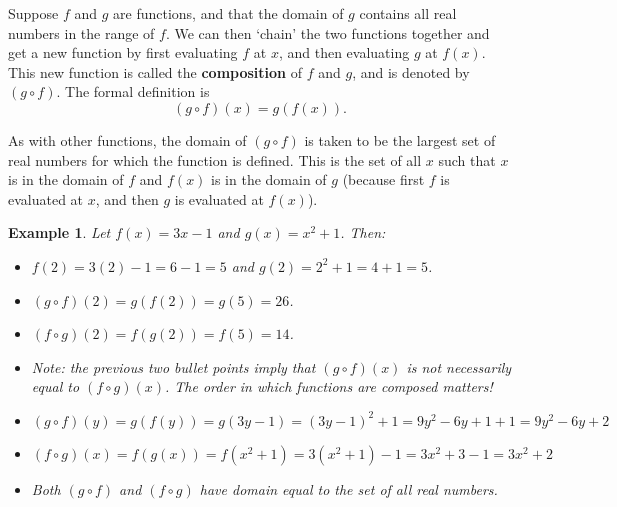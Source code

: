 \documentclass[11pt]{book}               %
\newtheorem{example}{Example}
\begin{document}
Suppose $f$ and $g$ are functions, and that the domain of $g$ contains all real numbers in the range of $f$.
We can then `chain' the two functions together and get a new function by first evaluating $f$ at $x$, and then evaluating $g$ at $f(x)$.  This new function is called the \textbf{composition} of $f$ and $g$, and is denoted by $(g \circ f)$.  The formal definition is 
$$(g \circ f)(x) = g(f(x)).$$

As with other functions, the domain of $(g\circ f)$ is taken to be the largest set of real numbers
for which the function is defined.  This is the set of all $x$ such that $x$ is in the domain of $f$ and $f(x)$ is in the domain of $g$ (because first $f$ is evaluated at $x$, and then $g$ is evaluated at $f(x)$).



\begin{example}
Let  $f(x) = 3x -1$ and $g(x) = x^2 + 1$.  Then:

\normalfont
\begin{itemize}
\item $f(2) = 3(2) -1 = 6-1 = 5$ and $g(2) = 2^2+1 = 4+1 =5$.
\item $(g \circ f)(2) = g(f(2)) = g(5) = 26$.
\item $(f \circ g)(2) = f(g(2)) = f(5) = 14$.
\item Note: the previous two bullet points imply that $(g \circ f)(x)$ is not necessarily equal
to $(f \circ g)(x)$.  The order in which functions are composed matters!
\item $(g\circ f)(y) = g(f(y)) = g(3y-1) = (3y-1)^2 + 1 = 9y^2-6y + 1 + 1 = 9y^2-6y + 2$
\item $(f\circ g)(x) = f(g(x)) = f(x^2 + 1) = 3(x^2 + 1) - 1 = 3x^2 + 3 -1 = 3x^2 +2$
\item Both $(g \circ f)$ and $(f \circ g)$ have domain equal to the set of all real numbers.
\end{itemize}
\end{example}
\end{document}
